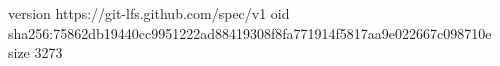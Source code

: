 version https://git-lfs.github.com/spec/v1
oid sha256:75862db19440cc9951222ad88419308f8fa771914f5817aa9e022667c098710e
size 3273
